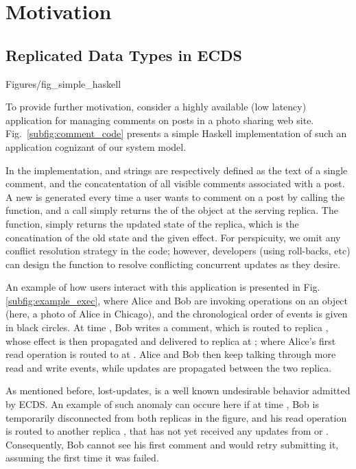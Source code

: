 \section{Motivation}
\label {sec:motiv}
\subsection{Replicated Data Types in ECDS }
 {Figures/fig_simple_haskell}

To provide further motivation, consider a highly available (low
latency) application for managing comments on posts in 
a photo sharing web site.  Fig.~\ref{subfig:comment_code}
presents a simple Haskell implementation of such an application
cognizant of our system model.  

In the implementation,
\effectC{} and \stateC{} strings are respectively defined as the text of a single comment, and 
the concatentation of all visible comments associated
with a post.
A new \effectC{} is generated every time a user wants to
comment on a post by calling the \writeC{} function, and a \readC{}
call simply returns the \stateC{} of the object at the serving
replica.
The \applyC{} function, simply returns the updated state of the replica,
which is the concatination of the old state and the given effect.
For perspicuity, we omit any
conflict resolution strategy in the code; however, developers (using
roll-backs, etc) can design the \applyC{} function to resolve
conflicting concurrent updates as they desire.

An example of how users interact with this application is presented
in Fig.\ref{subfig:example_exec}, where Alice and Bob are
invoking operations on an object (here, a photo of Alice in Chicago), and the 
chronological order of events is given in black circles.
At time , Bob
writes a comment, which is routed to replica , whose
effect is then propagated and delivered to replica  at ;
where Alice's first read operation is routed to at . 
Alice and Bob then keep talking
through more read and write events, while updates are propagated between
the two replica.

As mentioned before, lost-updates, is a well known  undesirable behavior admitted
by ECDS. 
An example of such anomaly can occure here if at
time , Bob is temporarily
disconnected from both replicas in the figure, and his read operation
is routed to another replica ,  that has not yet received any updates from
 or . Consequently,
Bob cannot see his first comment and would retry submitting it,
assuming the first time it was failed.

